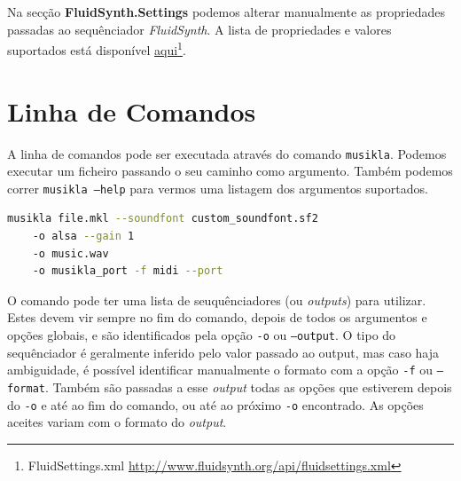 Na secção \textbf{FluidSynth.Settings} podemos alterar manualmente as propriedades passadas ao sequênciador \textit{FluidSynth}. A lista de propriedades e valores suportados está disponível \href{http://www.fluidsynth.org/api/fluidsettings.xml}{aqui}\footnote{FluidSettings.xml \url{http://www.fluidsynth.org/api/fluidsettings.xml}}.


\section{Linha de Comandos}
A linha de comandos pode ser executada através do comando \texttt{musikla}. Podemos executar um ficheiro passando o seu caminho como argumento. Também podemos correr \texttt{musikla --help} para vermos uma listagem dos argumentos suportados.

\begin{lstlisting}[caption={Exemplo de um ficheiro de configuração da linguagem},label={lst:configuration-file},language=Bash]
musikla file.mkl --soundfont custom_soundfont.sf2
    -o alsa --gain 1
    -o music.wav
    -o musikla_port -f midi --port
\end{lstlisting}

O comando pode ter uma lista de seuquênciadores (ou \textit{outputs}) para utilizar. Estes devem vir sempre no fim do comando, depois de todos os argumentos e opções globais, e são identificados pela opção \texttt{-o} ou \texttt{--output}. O tipo do sequênciador é geralmente inferido pelo valor passado ao output, mas caso haja ambiguidade, é possível identificar manualmente o formato com a opção \texttt{-f} ou \texttt{--format}. Também são passadas a esse \textit{output} todas as opções que estiverem depois do \texttt{-o} e até ao fim do comando, ou até ao próximo \texttt{-o} encontrado. As opções aceites variam com o formato do \textit{output}.


